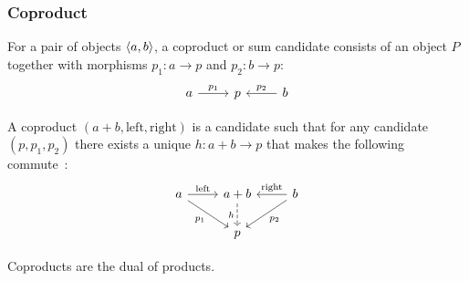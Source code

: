 \subsubsection*{Coproduct}

\begin{definition}

	For a pair of objects $\langle a, b\rangle$, a coproduct or sum candidate consists of an
	object $P$ together with morphisms $p_1: a\to p$ and
	$p_2:b\to p$:
	\[\begin{tikzcd}[ampersand replacement=\&]
		a \& p \& b
		\arrow["{p_1}", from=1-1, to=1-2]
		\arrow["{p_2}"', from=1-3, to=1-2]
	\end{tikzcd}\]

	A coproduct $(a + b, \mathrm{left}, \mathrm{right})$ is a candidate such that
	for any candidate $(p, p_1, p_2)$ there exists a unique $h: a+b\to p$ that
	makes the following commute~\parencite{leinster:basic_category_theory}:
	\[\begin{tikzcd}[ampersand replacement=\&]
		a \& {a+b} \& b \\
		\& p
		\arrow["{\mathrm{left}}", from=1-1, to=1-2]
		\arrow["{\mathrm{right}}"', from=1-3, to=1-2]
		\arrow["{p_1}"', from=1-1, to=2-2]
		\arrow["{p_2}", from=1-3, to=2-2]
		\arrow["h"', dashed, from=1-2, to=2-2]
	\end{tikzcd}\]
\end{definition}

\begin{remark}
	Coproducts are the dual of products.
\end{remark}

